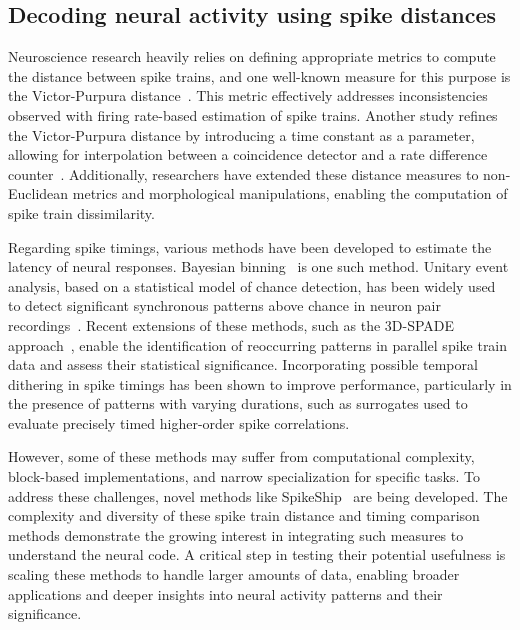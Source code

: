 \documentclass[runningheads]{llncs}
\begin{document}
\subsection{Decoding neural activity using spike distances}
%
Neuroscience research heavily relies on defining appropriate metrics to compute the distance between spike trains, and one well-known measure for this purpose is the Victor-Purpura distance~\cite{victor_nature_1996}. This metric effectively addresses inconsistencies observed with firing rate-based estimation of spike trains. Another study refines the Victor-Purpura distance by introducing a time constant as a parameter, allowing for interpolation between a coincidence detector and a rate difference counter~\cite{van_rossum_novel_2001}. Additionally, researchers have extended these distance measures to non-Euclidean metrics and morphological manipulations, enabling the computation of spike train dissimilarity. %

Regarding spike timings, various methods have been developed to estimate the latency of neural responses. Bayesian binning~\cite{levakova_review_2015} is one such method. Unitary event analysis, based on a statistical model of chance detection, has been widely used to detect significant synchronous patterns above chance in neuron pair recordings~\cite{grun_unitary_2002-1}. %
Recent extensions of these methods, such as the 3D-SPADE approach~\cite{stella_3d-spade_2019}, enable the identification of reoccurring patterns in parallel spike train data and assess their statistical significance. Incorporating possible temporal dithering in spike timings has been shown to improve performance, particularly in the presence of patterns with varying durations, such as surrogates used to evaluate precisely timed higher-order spike correlations. %

However, some of these methods may suffer from computational complexity, block-based implementations, and narrow specialization for specific tasks. To address these challenges, novel methods like {\sc SpikeShip}~\cite{sotomayor-gomez_spikeship_2021} are being developed. The complexity and diversity of these spike train distance and timing comparison methods demonstrate the growing interest in integrating such measures to understand the neural code. A critical step in testing their potential usefulness is scaling these methods to handle larger amounts of data, enabling broader applications and deeper insights into neural activity patterns and their significance.
\end{document}

